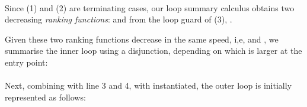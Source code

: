 \documentclass[acmsmall,screen,review,anonymous,nonacm]{acmart}
\begin{document}
\\[0.2em]
Since (1) and (2) are terminating cases, our loop summary calculus obtains two decreasing \emph{ranking functions}: 
 and  from the loop guard of (3), \ie{}.

Given these two ranking functions decrease in the same speed, i,e,  and , we summarise the inner loop using a disjunction, depending on which is larger at the entry point: 
\\
\\[0.2em]
Next, combining with line 3 and 4, \ie with  instantiated, the outer loop is initially represented as follows: 
\\[0.2em] 
\end{document}
